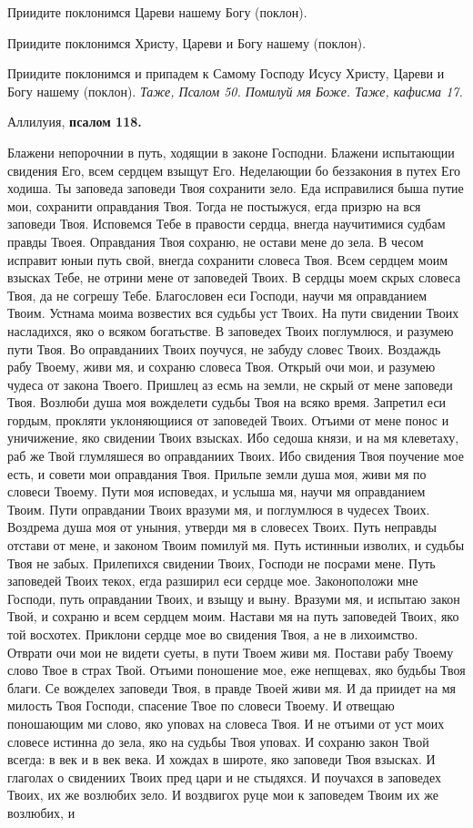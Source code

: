 Приидите поклонимся Цареви нашему Богу (поклон).

Приидите поклонимся Христу, Цареви и Богу нашему (поклон).

Приидите поклонимся и припадем к Самому Господу Исусу Христу, Цареви и Богу нашему (поклон). \itshape Таже, Псалом 50\normalfont{}. Помилуй мя Боже. \itshape Таже, кафисма 17\normalfont{}.


\medskip


Аллилуия, \bfseries псалом 118\normalfont{}.


Блажени непорочнии в путь, ходящии в законе Господни. Блажени испытающии свидения Его, всем сердцем взыщут Его. Неделающии бо беззакония в путех Его ходиша. Ты заповеда заповеди Твоя сохранити зело. Еда исправилися быша путие мои, сохранити оправдания Твоя. Тогда не постыжуся, егда призрю на вся заповеди Твоя. Исповемся Тебе в правости сердца, внегда научитимися судбам правды Твоея. Оправдания Твоя сохраню, не остави мене до зела. В чесом исправит юныи путь свой, внегда сохранити словеса Твоя. Всем сердцем моим взысках Тебе, не отрини мене от заповедей Твоих. В сердцы моем скрых словеса Твоя, да не согрешу Тебе. Благословен еси Господи, научи мя оправданием Твоим. Устнама моима возвестих вся судьбы уст Твоих. На пути свидении Твоих насладихся, яко о всяком богатьстве. В заповедех Твоих поглумлюся, и разумею пути Твоя. Во оправданиих Твоих поучуся, не забуду словес Твоих. Воздаждь рабу Твоему, живи мя, и сохраню словеса Твоя. Открый очи мои, и разумею чудеса от закона Твоего. Пришлец аз есмь на земли, не скрый от мене заповеди Твоя. Возлюби душа моя вожделети судьбы Твоя на всяко время. Запретил еси гордым, прокляти уклоняющиися от заповедей Твоих. Отъими от мене понос и уничижение, яко свидении Твоих взысках. Ибо седоша князи, и на мя клеветаху, раб же Твой глумляшеся во оправданиих Твоих. Ибо свидения Твоя поучение мое есть, и совети мои оправдания Твоя. Прильпе земли душа моя, живи мя по словеси Твоему. Пути моя исповедах, и услыша мя, научи мя оправданием Твоим. Пути оправдании Твоих вразуми мя, и поглумлюся в чудесех Твоих. Воздрема душа моя от уныния, утверди мя в словесех Твоих. Путь неправды отстави от мене, и законом Твоим помилуй мя. Путь истинныи изволих, и судьбы Твоя не забых. Прилепихся свидении Твоих, Господи не посрами мене. Путь заповедей Твоих текох, егда разширил еси сердце мое. Законоположи мне Господи, путь оправдании Твоих, и взыщу и выну. Вразуми мя, и испытаю закон Твой, и сохраню и всем сердцем моим. Настави мя на путь заповедей Твоих, яко той восхотех. Приклони сердце мое во свидения Твоя, а не в лихоимство. Отврати очи мои не видети суеты, в пути Твоем живи мя. Постави рабу Твоему слово Твое в страх Твой. Отъими поношение мое, еже непщевах, яко будьбы Твоя благи. Се вожделех заповеди Твоя, в правде Твоей живи мя. И да приидет на мя милость Твоя Господи, спасение Твое по словеси Твоему. И отвещаю поношающим ми слово, яко уповах на словеса Твоя. И не отъими от уст моих словесе истинна до зела, яко на судьбы Твоя уповах. И сохраню закон Твой всегда: в век и в век века. И хождах в широте, яко заповеди Твоя взысках. И глаголах о свидениих Твоих пред цари и не стыдяхся. И поучахся в заповедех Твоих, их же возлюбих зело. И воздвигох руце мои к заповедем Твоим их же возлюбих, и 